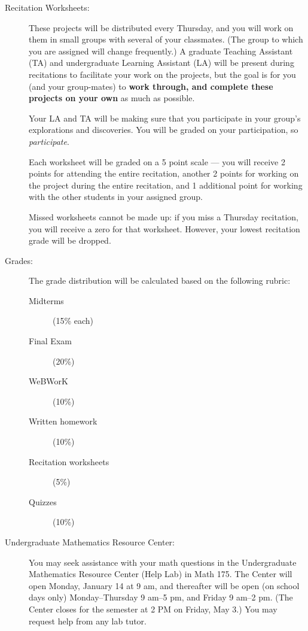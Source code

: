\documentclass[11pt]{article}
\begin{document}
\begin{description}
\item[Recitation Worksheets:] These projects will be distributed every
  Thursday, and you will work on them in small groups with several of
  your classmates. (The group to which you are assigned will change
  frequently.)  A graduate Teaching Assistant (TA) and undergraduate
  Learning Assistant (LA) will be present during recitations to
  facilitate your work on the projects, but the goal is for you (and
  your group-mates) to \textbf{work through, and complete these
    projects on your own} as much as possible.

  Your LA and TA will be making sure that you participate in your
  group's explorations and discoveries.  You will be graded on your
  participation, so {\it participate}.

  Each worksheet will be graded on a 5 point scale --- you will
  receive 2 points for attending the entire recitation, another 2
  points for working on the project during the entire recitation, and
  1 additional point for working with the other students in your
  assigned group.

  Missed worksheets cannot be made up: if you miss a Thursday
  recitation, you will receive a zero for that worksheet. However,
  your lowest recitation grade will be dropped.

\item[Grades:] The grade distribution will be calculated based on the
  following rubric:
  \begin{description}
  \item[Midterms] (15\% each)
  \item[Final Exam] (20\%)
  \item[WeBWorK] (10\%)
  \item[Written homework] (10\%)
  \item[Recitation worksheets] (5\%)  
  \item[Quizzes] (10\%)
  \end{description}

\item[Undergraduate Mathematics Resource Center:] You may seek
  assistance with your math questions in the Undergraduate Mathematics
  Resource Center (Help Lab) in Math 175.  The Center will open
  Monday, January 14 at 9 am, and thereafter will be open (on school
  days only) Monday--Thursday 9 am--5 pm, and Friday 9 am--2 pm.  (The
  Center closes for the semester at 2 PM on Friday, May 3.) You may
  request help from any lab tutor.
\end{description}
\end{document}
